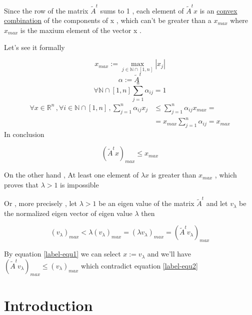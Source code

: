 \documentclass[9pt,twocolumn]{article}
\begin{document}
Since the row of the matrix \(\tilde{A}^t\) sums to 1 , each element of \(\tilde{A}^tx\) is an
\href{https://en.wikipedia.org/wiki/Convex\_combination}{convex combination} of the components of x , which can't be greater than a \(x_{max}\) where \(x_{max}\) is the maxium
element of the vector x .

Let's see it formally

\[
x_{max} := \max_{j\in\mathbb{N}\cap [1,n]}{|x_j|}
\]
\[
\alpha := \tilde{A}^t
\]
\[
\forall \mathbb{N}\cap [1,n] \sum_{j=1}^{n} \alpha_{ij} = 1
\]
\begin{align*}
\forall x\in \mathbb{R}^{n} \,, \forall i\in\mathbb{N}\cap [1,n]  \,, \sum_{j=1}^n\alpha _{ij} x_{j}  &\leq\sum_{j=1}^n \alpha_{ij}x_{max}= \\
                                                                    &=x_{max} \sum_{j=1}^{n} \alpha_{ij} = x_{max}
\end{align*}
In conclusion

\begin{equation}
\label{label-equ1}
(\tilde{A}^t x)_{max} \leq x_{max}
\end{equation}

On the other hand , At least one element of \(\lambda x\) is greater than \(x_{max}\) , which proves that
\(\lambda > 1\) is impossible

Or , more precisely , let \(\lambda > 1\) be an eigen value of the matrix
\(\tilde{A}^t\) and let \(v_{\lambda}\) be the normalized eigen vector of
eigen value \(\lambda\) then

\begin{equation}
\label{label-equ2}
(v_{\lambda})_{max} <
\lambda (v_{\lambda})_{max} =
( \lambda v_{\lambda} )_{max} =
( \tilde{A}^t v_{\lambda} )_{max}
\end{equation}

By equation \ref{label-equ1} we can select \(x:=v_{\lambda}\) and we'll have
\((\tilde{A}^t v_{\lambda})_{max} \leq (v_{\lambda})_{max}\) which contradict equation \ref{label-equ2}





\section*{Introduction}
\label{sec:orgeff8cc9}
\end{document}
